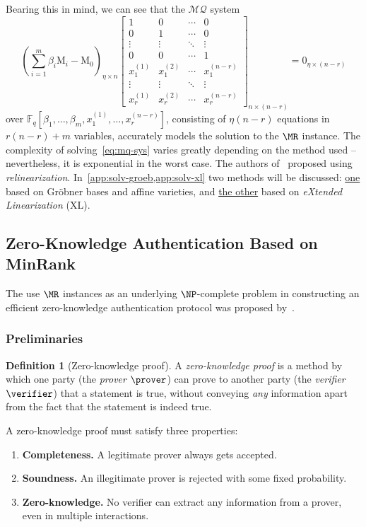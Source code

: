 \documentclass{article}
\theoremstyle{remark}
\theoremstyle{definition}
\newtheorem{definition}{Definition}
\theoremstyle{plain}
\newcommand{\matr}[1]{\bm{\mathrm{#1}}}
\newcommand{\MQ}{\ensuremath{\mathcal{MQ}}}
\begin{document}
Bearing this in mind, we can see that the \MQ{} system
\begin{equation}\label{eq:mq-sys}
  \left(\sum\limits_{i = 1}^{m}\beta_i \matr{M}_i - \matr{M}_0\right)_{\eta
    \times n}
  \begin{bmatrix}
    1 & 0 & \cdots & 0 \\
    0 & 1 & \cdots & 0 \\
    \vdots & \vdots & \ddots & \vdots \\
    0 & 0 & \cdots & 1 \\
    x^{(1)}_1 & x^{(2)}_1 & \cdots & x^{(n - r)}_1 \\
    \vdots & \vdots & \ddots & \vdots \\
    x^{(1)}_r & x^{(2)}_r & \cdots & x^{(n - r)}_r
  \end{bmatrix}_{n \times (n - r)} = \matr{0}_{\eta \times (n - r)}
\end{equation}
over
$\mathbb{F}_q\left[\beta_1,\ldots,\beta_m,x^{(1)}_1,\ldots,x^{(n -
    r)}_r\right]$, consisting of $\eta (n - r)$ equations in $r (n - r) + m$
variables, accurately models the solution to the $\MR$ instance.  The complexity
of solving~\eqref{eq:mq-sys} varies greatly depending on the method used --
nevertheless, it is exponential in the worst case.  The authors
of~\autocite{KS99} proposed using \emph{relinearization}.
In~\cref{app:solv-groeb,app:solv-xl} two methods will be discussed:
\hyperref[app:solv-groeb]{one} based on Gröbner bases and affine varieties, and
\hyperref[app:solv-xl]{the other} based on \emph{eXtended Linearization} (XL).

\subsection{Zero-Knowledge Authentication Based on MinRank}\label{sec:zka}
The use $\MR$ instances as an underlying $\NP$-complete problem in constructing
an efficient zero-knowledge authentication protocol was proposed
by~\textcite{Cou01}.

\subsubsection{Preliminaries}\label{sec:pre}
\begin{definition}[Zero-knowledge proof]\label{def:zkp}
  A \emph{zero-knowledge proof} is a method by which one party (the
  \emph{prover} $\prover$) can prove to another party (the \emph{verifier}
  $\verifier$) that a statement is true, without conveying \emph{any}
  information apart from the fact that the statement is indeed true.
\end{definition}
A zero-knowledge proof must satisfy three properties:
\begin{enumerate}
\item \label{itm:cmp} \textbf{Completeness.} A legitimate prover always gets
  accepted.
\item \label{itm:snd} \textbf{Soundness.} An illegitimate prover is rejected
  with some fixed probability.
\item \label{itm:zk} \textbf{Zero-knowledge.} No verifier can extract any
  information from a prover, even in multiple interactions.
\end{enumerate}
\end{document}

